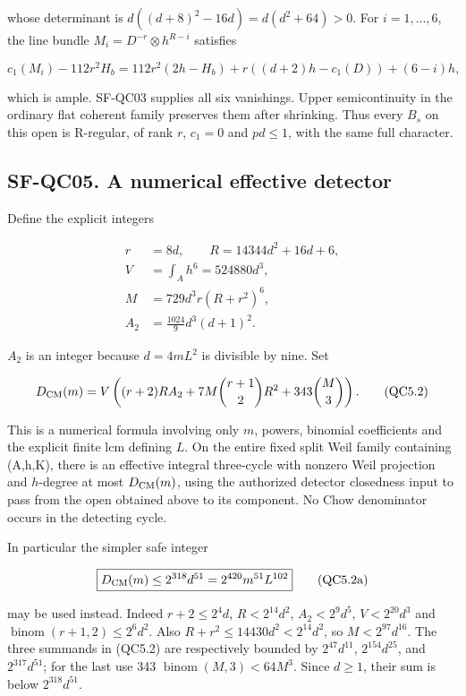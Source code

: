 whose determinant is \(d((d+8)^{2}-16d)=d(d^{2}+64)>0\). For
\(i=1,\ldots ,6\), the line bundle \(M_i=D^{-r}\otimes h^{R-i}\)
satisfies

\[
 c_1(M_i)-112r^2H_b
 =112r^2(2h-H_b)+r((d+2)h-c_1(D))+(6-i)h,
\]

which is ample. SF-QC03 supplies all six vanishings. Upper
semicontinuity in the ordinary flat coherent family preserves them after
shrinking. Thus every \(B_s\) on this open is R-regular, of rank \(r\),
\(c_{1}=0\) and \(pd\le 1\), with the same full character.

\subsection{SF-QC05. A numerical effective
detector}\label{SF-QC05}

Define the explicit integers

\[
 \begin{split}
 r&=8d,\qquad R=14344d^2+16d+6,\\
 V&=\int_A h^6=524880d^3,\\
 M&=729d^3r(R+r^2)^6,\\
 A_2&=\frac{1024}{9}d^3(d+1)^2.
 \end{split}
 \tag{QC5.1}
\]

\(A_{2}\) is an integer because \(d=4mL^{2}\) is divisible by nine. Set

\[
 D_{\rm CM}(m)=V\left((r+2)R A_2
       +7M\binom{r+1}{2}R^2+343\binom M3\right).
 \tag{QC5.2}
\]

This is a numerical formula involving only \(m\), powers, binomial
coefficients and the explicit finite lcm defining \(L\). On the entire
fixed split Weil family containing (A,h,K), there is an effective
integral three-cycle with nonzero Weil projection and \(h\)-degree at
most \(D_{\rm CM}(m)\), using the authorized detector closedness input
to pass from the open obtained above to its component. No Chow
denominator occurs in the detecting cycle.

In particular the simpler safe integer

\[
 \boxed{D_{\rm CM}(m)\le 2^{318}d^{51}
                  =2^{420}m^{51}L^{102}}
 \tag{QC5.2a}
\]

may be used instead. Indeed \(r+2\le 2^{4}d\), \(R<2^{14}d^{2}\),
\(A_{2}<2^{9}d^{5}\), \(V<2^{20}d^{3}\) and
\(\operatorname{binom}(r+1,2)\le 2^{6}d^{2}\). Also
\(R+r^{2}\le 14430d^{2}<2^{14}d^{2}\), so \(M<2^{97}d^{16}\). The three
summands in (QC5.2) are respectively bounded by \(2^{47}d^{11}\),
\(2^{154}d^{25}\), and \(2^{317}d^{51}\); for the last use 343
\(\operatorname{binom}(M,3)<64M^{3}\). Since \(d\ge 1\), their sum is
below \(2^{318}d^{51}\).

